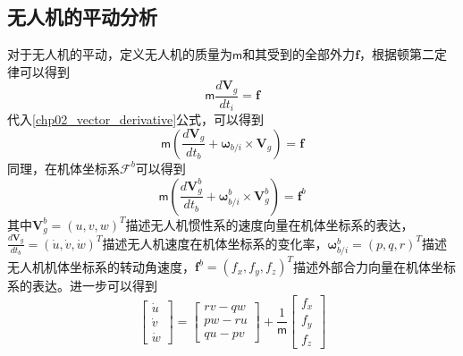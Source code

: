 \subsection{无人机的平动分析}
对于无人机的平动，定义无人机的质量为$\mathsf{m}$和其受到的全部外力$\mathbf{f}$，根据顿第二定律可以得到
\begin{equation}
\mathsf{m} \frac{d \mathbf{V}_g}{d t_i} = \mathbf{f}
\end{equation}
代入\ref{chp02_vector_derivative}公式，可以得到
\begin{equation}
\mathsf{m}(\frac{d \mathbf{V}_g }{dt_b}+ \mathbf{\omega}_{b/i} \times \mathbf{V}_g)=\mathbf{f}
\end{equation}
同理，在机体坐标系$\mathcal{F}^b$可以得到
\begin{equation}
\mathsf{m}(\frac{d \mathbf{V}^b_g }{dt_b}+ \mathbf{\omega}_{b/i}^b \times \mathbf{V}^b_g)=\mathbf{f}^b
\end{equation}
其中$\mathbf{V}_g^b=(u, v, w)^T$描述无人机惯性系的速度向量在机体坐标系的表达，$\frac{d \mathbf{V}_g }{dt_b}=(\dot{u}, \dot{v}, \dot{w})^T$描述无人机速度在机体坐标系的变化率，$\mathbf{\omega}_{b/i}^b=(p, q, r)^T$描述无人机机体坐标系的转动角速度，$\mathbf{f}^b = (f_x, f_y, f_z)^T$描述外部合力向量在机体坐标系的表达。进一步可以得到
\begin{equation}
\begin{bmatrix} \dot{u} \\ \dot{v} \\ \dot{w}  \end{bmatrix} = \begin{bmatrix} rv-qw \\ pw-ru \\ qu-pv  \end{bmatrix} + \frac{1}{\mathsf{m}} \begin{bmatrix} f_x \\ f_y \\ f_z  \end{bmatrix}
\end{equation}



